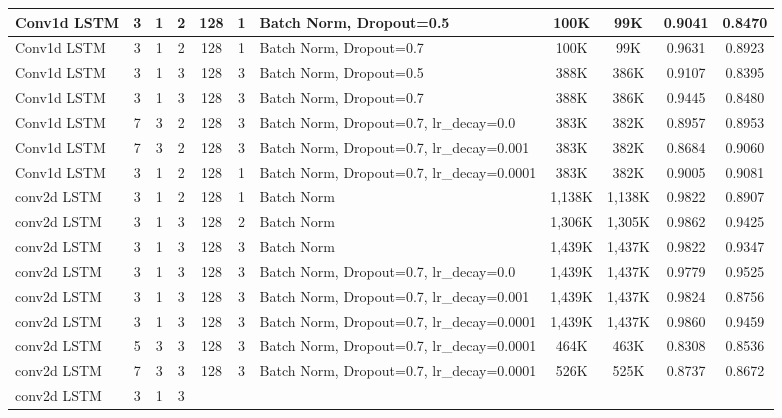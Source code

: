 \documentclass{article}
\begin{document}
\begin{table}
{\begin{tabular} { |m{3cm}|c|c|c|c|c|m{3cm}|c|c|c|c| }
      \hline
      Conv1d LSTM & 3 & 1 & 2 &
      128 & 1 & Batch Norm, Dropout=0.5 &
      100K & 99K & 0.9041 & 0.8470 \\ \hline
      Conv1d LSTM & 3 & 1 & 2 &
      128 & 1 & Batch Norm, Dropout=0.7 &
      100K & 99K & 0.9631 & 0.8923 \\ \hline
      Conv1d LSTM & 3 & 1 & 3 &
      128 & 3 & Batch Norm, Dropout=0.5 &
      388K & 386K & 0.9107 & 0.8395 \\ \hline
      Conv1d LSTM & 3 & 1 & 3 &
      128 & 3 & Batch Norm, Dropout=0.7 &
      388K & 386K & 0.9445 & 0.8480 \\ \hline
      \hline
      Conv1d LSTM & 7 & 3 & 2 &
      128 & 3 & Batch Norm, Dropout=0.7, lr\_decay=0.0 &
      383K & 382K & 0.8957 & 0.8953 \\ \hline
      Conv1d LSTM & 7 & 3 & 2 &
      128 & 3 & Batch Norm, Dropout=0.7, lr\_decay=0.001 &
      383K & 382K & 0.8684 & 0.9060 \\ \hline
      Conv1d LSTM & 3 & 1 & 2 &
      128 & 1 & Batch Norm, Dropout=0.7, lr\_decay=0.0001 &
      383K & 382K & 0.9005 & 0.9081 \\ \hline
      \hline
      conv2d LSTM & 3 & 1 & 2 &
      128 & 1 & Batch Norm &
      1,138K & 1,138K & 0.9822 & 0.8907 \\ \hline
      conv2d LSTM & 3 & 1 & 3 &
      128 & 2 & Batch Norm &
      1,306K & 1,305K & 0.9862 & 0.9425 \\ \hline
      conv2d LSTM & 3 & 1 & 3 &
      128 & 3 & Batch Norm &
      1,439K & 1,437K & 0.9822 & 0.9347 \\ \hline
      \hline
      conv2d LSTM & 3 & 1 & 3 &
      128 & 3 & Batch Norm, Dropout=0.7, lr\_decay=0.0 &
      1,439K & 1,437K & 0.9779 & 0.9525 \\ \hline
      conv2d LSTM & 3 & 1 & 3 &
      128 & 3 & Batch Norm, Dropout=0.7, lr\_decay=0.001 &
      1,439K & 1,437K & 0.9824 & 0.8756 \\ \hline
      conv2d LSTM & 3 & 1 & 3 &
      128 & 3 & Batch Norm, Dropout=0.7, lr\_decay=0.0001 &
      1,439K & 1,437K & 0.9860 & 0.9459 \\ \hline
      \hline
      conv2d LSTM & 5 & 3 & 3 &
      128 & 3 & Batch Norm, Dropout=0.7, lr\_decay=0.0001 &
      464K & 463K & 0.8308 & 0.8536 \\ \hline
      conv2d LSTM & 7 & 3 & 3 &
      128 & 3 & Batch Norm, Dropout=0.7, lr\_decay=0.0001 &
      526K & 525K & 0.8737 & 0.8672 \\ \hline
      \hline
      conv2d LSTM & 3 & 1 & 3 &

\end{tabular}}
\end{table}
\end{document}
